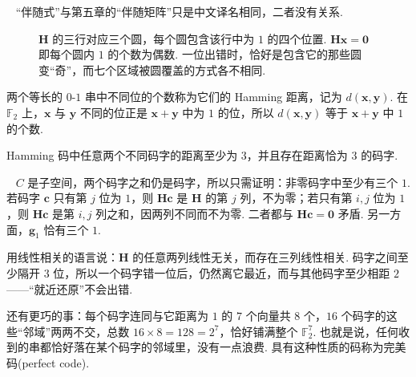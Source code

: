 \documentclass[lang=cn,10.5pt,scheme=chinese,toc=twocol,section,chinesefont=nofont,
twoside,citestyle=gb7714-2015,bibstyle=gb7714-2015]{elegantbook}
\DeclareRobustCommand{\textbf}[1]{{\lnsemiboldlatin\lnsemiboldcjk #1}}
\newcommand{\vv}[1]{\boldsymbol{#1}}
\newcommand{\zero}{\boldsymbol{0}}          %
\numberwithin{equation}{section}   %
\newcommand*{\lnlabel}[1]{{\sffamily\bfseries\color{black}#1}}
\renewenvironment{proof}{%
	\par\noindent\lnlabel{\proofname}\;\ \color{black!90}\cfs}{\par}
\renewenvironment{remark}{\noindent\lnlabel{\remarkname}\ }{\par}
\begin{document}
\begin{remark}
  “伴随式”与第五章的“伴随矩阵”只是中文译名相同，二者没有关系.
\end{remark}

\begin{figure}[htbp]
  \centering
  \caption{$\vv H$ 的三行对应三个圆，每个圆包含该行中为 $1$ 的四个位置. $\vv H\vv x=\zero$ 即每个圆内 $1$ 的个数为偶数. 一位出错时，恰好是包含它的那些圆变“奇”，而七个区域被圆覆盖的方式各不相同.}
  \label{fig:hamming-venn}
\end{figure}

两个等长的 $0$-$1$ 串中不同位的个数称为它们的 \textbf{Hamming 距离}，记为 $d(\vv x,\vv y)$. 在 $\mathbb{F}_2$ 上，$\vv x$ 与 $\vv y$ 不同的位正是 $\vv x+\vv y$ 中为 $1$ 的位，所以 $d(\vv x,\vv y)$ 等于 $\vv x+\vv y$ 中 $1$ 的个数.

\begin{proposition}
  Hamming 码中任意两个不同码字的距离至少为 $3$，并且存在距离恰为 $3$ 的码字.
\end{proposition}
\begin{proof}
  $C$ 是子空间，两个码字之和仍是码字，所以只需证明：非零码字中至少有三个 $1$. 若码字 $\vv c$ 只有第 $j$ 位为 $1$，则 $\vv H\vv c$ 是 $\vv H$ 的第 $j$ 列，不为零；若只有第 $i,j$ 位为 $1$，则 $\vv H\vv c$ 是第 $i,j$ 列之和，因两列不同而不为零. 二者都与 $\vv H\vv c=\zero$ 矛盾. 另一方面，$\vv g_1$ 恰有三个 $1$.
\end{proof}

用线性相关的语言说：$\vv H$ 的任意两列线性无关，而存在三列线性相关. 码字之间至少隔开 $3$ 位，所以一个码字错一位后，仍然离它最近，而与其他码字至少相距 $2$——“就近还原”不会出错.

还有更巧的事：每个码字连同与它距离为 $1$ 的 $7$ 个向量共 $8$ 个，$16$ 个码字的这些“邻域”两两不交，总数 $16\times8=128=2^7$，恰好铺满整个 $\mathbb{F}_2^7$. 也就是说，任何收到的串都恰好落在某个码字的邻域里，没有一点浪费. 具有这种性质的码称为\textbf{完美码}(perfect code).
\end{document}
